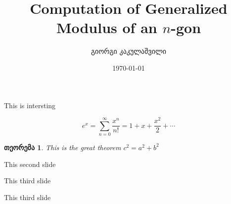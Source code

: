 \documentclass[12pt]{article}
\theoremstyle{colored}
\newtheorem{theorem}{თეორემა}
\newenvironment{slide}[1]{\newpage #1}{\vfill\rightline{\thepage}}
\begin{document}
\title{\Large\color{primary} Computation of Generalized Modulus of an $n$-gon}
\author{\normalsize გიორგი კაკულაშვილი}
\date{\normalsize \today}
\maketitle




\begin{slide}

    This is intersting

    \[
        e^x = \sum_{n=0}^{\infty} \frac{x^n}{n!} = 1 + x + \frac{x^2}{2} + \cdots
    \]

    \begin{theorem}
        This is the great theorem $c^2=a^2+b^2$
    \end{theorem}

\end{slide}


\begin{slide}
    This second slide 

    
\end{slide}

\begin{slide}
    This third slide
\end{slide}


\begin{slide}
    This third slide
\end{slide}
\end{document}
